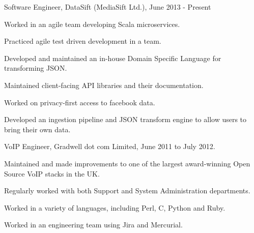 \documentclass[a4paper]{article}
\renewenvironment{itemize}{
  \begin{list}{}{
    \setlength{\leftmargin}{1.5em}
  }
}{
  \end{list}
}
\newenvironment{packed}{
\begin{itemize}
  \setlength{\itemsep}{0pt}
  \setlength{\parskip}{0pt}
  \setlength{\parsep}{0pt}
}{\end{itemize}}
\begin{document}
\begin{itemize}
\item Software Engineer, DataSift (MediaSift Ltd.), June 2013 - Present
        \begin{packed}
            \item Worked in an agile team developing Scala microservices.
            \item Practiced agile test driven development in a team.
            \item Developed and maintained an in-house Domain Specific Language for transforming JSON.
            \item Maintained client-facing API libraries and their documentation.
            \item Worked on privacy-first access to facebook data.
            \item Developed an ingestion pipeline and JSON transform engine to allow users to bring their own data.
        \end{packed}
\end{itemize}

\begin{itemize}
\item VoIP Engineer, Gradwell dot com Limited, June 2011 to July 2012.
        \begin{packed}
            \item Maintained and made improvements to one of the largest award-winning Open Source VoIP stacks in the UK.
            \item Regularly worked with both Support and System Administration departments.
            \item Worked in a variety of languages, including Perl, C, Python and Ruby.
            \item Worked in an engineering team using Jira and Mercurial.
        \end{packed}
\end{itemize}
\end{document}
